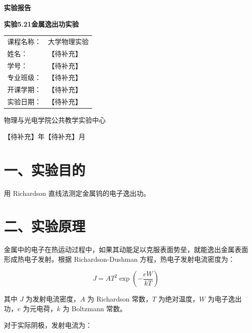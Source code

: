 \documentclass[UTF8,a4paper,zihao=-4]{ctexart}
\begin{document}
\begin{titlepage}
    \centering
    {\bfseries 实验报告\par}
    \vspace{1cm}
    {\bfseries 实验5.21\quad 金属逸出功实验\par}
    \vspace{2cm}

    \renewcommand{\arraystretch}{1.8}
    \begin{tabular}{p{4cm}p{8cm}}
        课程名称： & 大学物理实验 \\
        姓名： & 【待补充】 \\
        学号： & 【待补充】 \\
        专业班级： & 【待补充】 \\
        开课学期： & 【待补充】 \\
        实验日期： & 【待补充】 \\
    \end{tabular}

    \vfill
    { 物理与光电学院公共教学实验中心\par}
    \vspace{0.5cm}
    { 【待补充】年【待补充】月\par}
\end{titlepage}

\newpage

\section*{一、实验目的}

用 Richardson 直线法测定金属钨的电子逸出功。

\section*{二、实验原理}

金属中的电子在热运动过程中，如果其动能足以克服表面势垒，就能逸出金属表面形成热电子发射。根据 Richardson-Dushman 方程，热电子发射电流密度为：

\begin{equation}
    J = A T^2 \exp\left(-\frac{eW}{kT}\right)
\end{equation}

其中 $J$ 为发射电流密度，$A$ 为 Richardson 常数，$T$ 为绝对温度，$W$ 为电子逸出功，$e$ 为元电荷，$k$ 为 Boltzmann 常数。

对于实际阴极，发射电流为：
\end{document}
